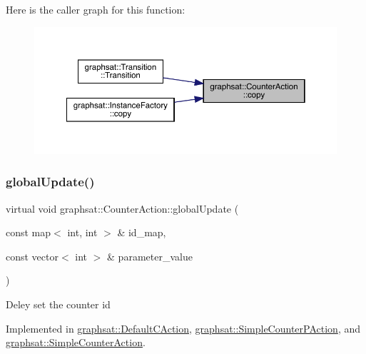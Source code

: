 Here is the caller graph for this function\+:
\nopagebreak
\begin{figure}[H]
\begin{center}
\leavevmode
\includegraphics[width=350pt]{classgraphsat_1_1_counter_action_aa6ab6ebd8e13b466dba062efea962691_icgraph}
\end{center}
\end{figure}
\mbox{\label{classgraphsat_1_1_counter_action_a09e8a5779f0ae70ea07e8974d93edf2e}} 
\subsubsection{\texorpdfstring{globalUpdate()}{globalUpdate()}}
{\footnotesize\ttfamily virtual void graphsat\+::\+Counter\+Action\+::global\+Update (\begin{DoxyParamCaption}\item[{const map$<$ int, int $>$ \&}]{id\+\_\+map,  }\item[{const vector$<$ int $>$ \&}]{parameter\+\_\+value }\end{DoxyParamCaption})\hspace{0.3cm}{\ttfamily [pure virtual]}}

Deley set the counter id 

Implemented in \mbox{\hyperlink{classgraphsat_1_1_default_c_action_a70f9da2bbdd46e42d279b867195daa56}{graphsat\+::\+Default\+C\+Action}}, \mbox{\hyperlink{classgraphsat_1_1_simple_counter_p_action_ae4d8689afbfd0d5f8a351bf19dbb8132}{graphsat\+::\+Simple\+Counter\+P\+Action}}, and \mbox{\hyperlink{classgraphsat_1_1_simple_counter_action_afec31087ec27170187d831e2de9a2aa4}{graphsat\+::\+Simple\+Counter\+Action}}.

